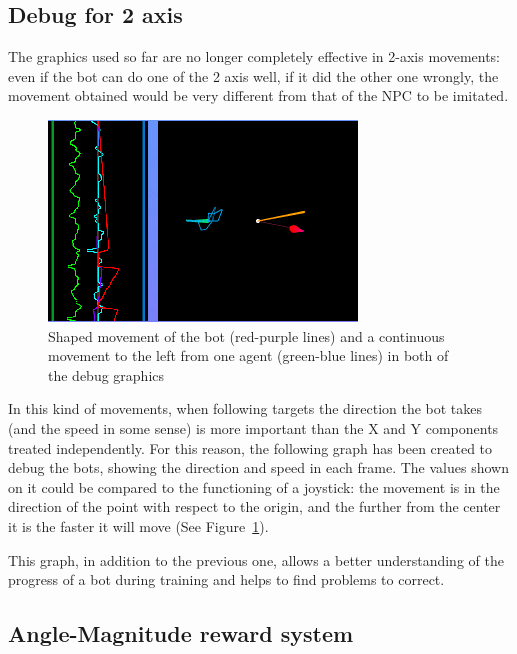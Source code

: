 \subsection{Debug for 2 axis} %

The graphics used so far are no longer completely effective in 2-axis movements: even if the bot can do one of the 2 axis well, if it did the other one wrongly, the movement obtained would be very different from that of the NPC to be imitated.

\begin{figure}[h]
  \centering
		\includegraphics[width=.8\textwidth]{img/debug2axis.png}
  \caption{Shaped movement of the bot (red-purple lines) and a continuous movement to the left from one agent (green-blue lines) in both of the debug graphics}
  \label{fig:debug2axis}
\end{figure}

In this kind of movements, when following targets the direction the bot takes (and the speed in some sense) is more important than the X and Y components treated independently. For this reason, the following graph has been created to debug the bots, showing the direction and speed in each frame. The values shown on it could be compared to the functioning of a joystick: the movement is in the direction of the point with respect to the origin, and the further from the center it is the faster it will move (See Figure~\ref{fig:debug2axis}).

This graph, in addition to the previous one, allows a better understanding of the progress of a bot during training and helps to find problems to correct.

\subsection{Angle-Magnitude reward system} %

